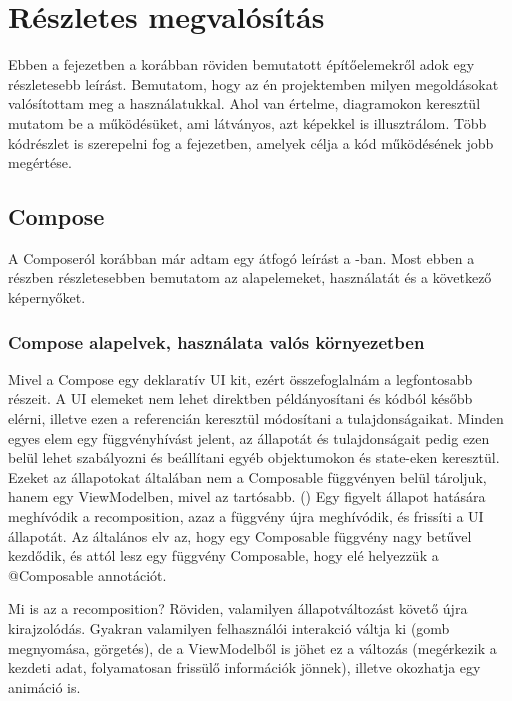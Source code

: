 \chapter{Részletes megvalósítás}
\label{sec:Details}

Ebben a fejezetben a korábban röviden bemutatott építőelemekről adok egy részletesebb leírást.  
Bemutatom, hogy az én projektemben milyen megoldásokat valósítottam meg a használatukkal.  
Ahol van értelme, diagramokon keresztül mutatom be a működésüket, ami látványos, azt képekkel is illusztrálom.  
Több kódrészlet is szerepelni fog a fejezetben, amelyek célja a kód működésének jobb megértése.  

\section{Compose}
\label{sec:Compose}

A Composeról korábban már adtam egy átfogó leírást a -ban. Most ebben a részben részletesebben bemutatom az alapelemeket, használatát és a következő képernyőket.  

\subsection{Compose alapelvek, használata valós környezetben}

Mivel a Compose egy deklaratív UI kit, ezért összefoglalnám a legfontosabb részeit.  
A UI elemeket nem lehet direktben példányosítani és kódból később elérni, illetve ezen a referencián keresztül módosítani a tulajdonságaikat.  
Minden egyes elem egy függvényhívást jelent, az állapotát és tulajdonságait pedig ezen belül lehet szabályozni és beállítani egyéb objektumokon és state-eken keresztül.  
Ezeket az állapotokat általában nem a Composable függvényen belül tároljuk, hanem egy ViewModelben, mivel az tartósabb. ()  
Egy figyelt állapot hatására meghívódik a recomposition, azaz a függvény újra meghívódik, és frissíti a UI állapotát.  
Az általános elv az, hogy egy Composable függvény nagy betűvel kezdődik, és attól lesz egy függvény Composable, hogy elé helyezzük a @Composable annotációt.  

Mi is az a recomposition?  
Röviden, valamilyen állapotváltozást követő újra kirajzolódás.  
Gyakran valamilyen felhasználói interakció váltja ki (gomb megnyomása, görgetés), de a ViewModelből is jöhet ez a változás (megérkezik a kezdeti adat, folyamatosan frissülő információk jönnek), illetve okozhatja egy animáció is.  

